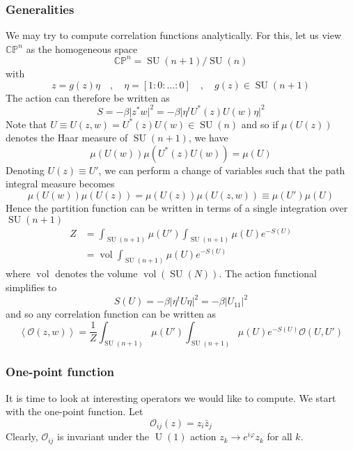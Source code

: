 \documentclass[a4paper,11pt]{article}
\theoremstyle{definition}
\newcommand{\CP}{\mathbb{CP}}
\DeclareMathOperator{\SU}{SU}
\DeclareMathOperator{\U}{U}
\DeclareMathOperator{\vol}{vol}
\newcommand{\OO}{\mathcal O}
\begin{document}
\subsubsection{Generalities}
We may try to compute correlation functions analytically.
For this, let us view $\CP^n$ as the homogeneous space 
\begin{equation}
  \CP^n = \SU(n+1) / \SU(n)
\end{equation}
with 
\begin{equation}
  z = g(z) \eta \quad , \quad \eta = [1:0:\dots:0] \quad , \quad g(z) \in \SU(n+1)
\end{equation}
The action can therefore be written as 
\begin{equation}
  S = -\beta \lvert z^* w \rvert^2 = - \beta \lvert \eta^t U^*(z)U(w) \eta \rvert^2
\end{equation}
Note that $U \equiv U(z,w) = U^*(z)U(w) \in \SU(n)$ and so if $\mu(U(z))$ denotes the Haar measure of $\SU(n+1)$, we have
\begin{equation}
  \mu(U(w)) \mu(U^*(z)U(w)) = \mu(U)
\end{equation}
Denoting $U(z) \equiv U'$, we can perform a change of variables such that the path integral measure becomes
\begin{equation}
  \mu(U(w))\mu(U(z)) = \mu(U(z))\mu(U(z,w)) \equiv \mu(U')\mu(U)
\end{equation}
Hence the partition function can be written in terms of a single integration over $\SU(n+1)$
\begin{equation}
  \begin{split} 
    Z &= \int_{\SU(n+1)} \mu(U') \int_{\SU(n+1)} \mu(U) e^{-S(U)} \\
    &= \vol \int_{\SU(n+1)} \mu(U) e^{-S(U)}
  \end{split}
\end{equation}
where $\vol$ denotes the volume $\vol(\SU(N))$.
The action functional simplifies to 
\begin{equation}
  S(U) = - \beta \lvert \eta^t U \eta \rvert^2 = - \beta \lvert U_{11} \rvert^2
\end{equation}
and so any correlation function can be written as 
\begin{equation}
  \left\langle \OO(z,w) \right\rangle = \frac{1}{Z} \int_{\SU(n+1)} \mu(U') \int_{\SU(n+1)}\mu(U) e^{-S(U)} \OO(U,U') 
\end{equation}

\subsubsection{One-point function}
It is time to look at interesting operators we would like to compute.
We start with the one-point function.
Let 
\begin{equation}
  \OO_{ij}(z) = z_i \bar z_j 
\end{equation}
Clearly, $\OO_{ij}$ is invariant under the $\U(1)$ action $z_k \to e^{i\varphi}z_k$ for all $k$.
\end{document}
